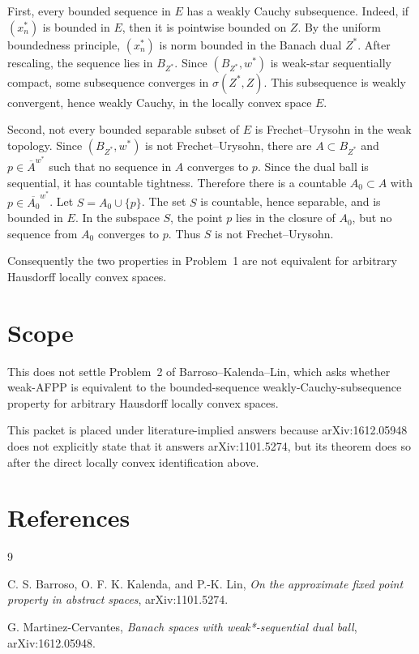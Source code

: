\documentclass[11pt]{amsart}
\begin{document}
First, every bounded sequence in \(E\) has a weakly Cauchy subsequence. Indeed,
if \((x_n^*)\) is bounded in \(E\), then it is pointwise bounded on \(Z\). By
the uniform boundedness principle, \((x_n^*)\) is norm bounded in the Banach
dual \(Z^*\). After rescaling, the sequence lies in \(B_{Z^*}\). Since
\((B_{Z^*},w^*)\) is weak-star sequentially compact, some subsequence converges
in \(\sigma(Z^*,Z)\). This subsequence is weakly convergent, hence weakly
Cauchy, in the locally convex space \(E\).

Second, not every bounded separable subset of \(E\) is Frechet--Urysohn in the
weak topology. Since \((B_{Z^*},w^*)\) is not Frechet--Urysohn, there are
\(A\subset B_{Z^*}\) and \(p\in \overline A^{w^*}\) such that no sequence in
\(A\) converges to \(p\). Since the dual ball is sequential, it has countable
tightness. Therefore there is a countable \(A_0\subset A\) with
\(p\in\overline{A_0}^{w^*}\). Let \(S=A_0\cup\{p\}\). The set \(S\) is
countable, hence separable, and is bounded in \(E\). In the subspace \(S\),
the point \(p\) lies in the closure of \(A_0\), but no sequence from \(A_0\)
converges to \(p\). Thus \(S\) is not Frechet--Urysohn.

Consequently the two properties in Problem~1 are not equivalent for arbitrary
Hausdorff locally convex spaces.

\section*{Scope}

This does not settle Problem~2 of Barroso--Kalenda--Lin, which asks whether
weak-AFPP is equivalent to the bounded-sequence weakly-Cauchy-subsequence
property for arbitrary Hausdorff locally convex spaces.

This packet is placed under literature-implied answers because arXiv:1612.05948
does not explicitly state that it answers arXiv:1101.5274, but its theorem
does so after the direct locally convex identification above.

\section*{References}

\begin{thebibliography}{9}

C. S. Barroso, O. F. K. Kalenda, and P.-K. Lin,
\emph{On the approximate fixed point property in abstract spaces},
arXiv:1101.5274.

G. Martinez-Cervantes,
\emph{Banach spaces with weak*-sequential dual ball},
arXiv:1612.05948.

\end{thebibliography}
\end{document}
